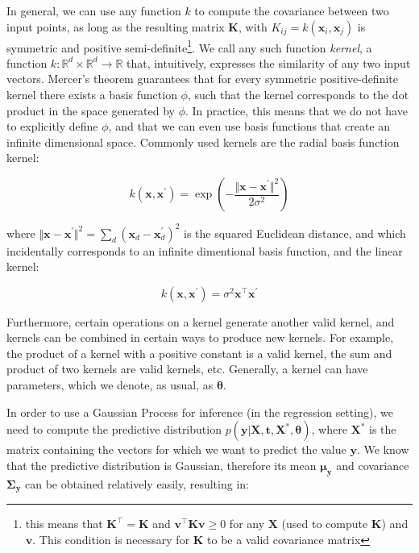 \documentclass[a4paper]{book}
\begin{document}
In general, we can use any function $k$ to compute the covariance between two input points, as long as the resulting matrix $\bm K$, with $K_{ij}=k(\bm x_i,\bm x_j)$ is symmetric and positive semi-definite\footnote{this means that $\bm K^\intercal=\bm K$ and $\bm v^\intercal\bm K\bm v\geq 0$ for any $\bm X$ (used to compute $\bm K$) and $\bm v$. This condition is necessary for $\bm K$ to be a valid covariance matrix}. We call any such function  \emph{kernel}, a function $k:\mathbb{R}^d\times\mathbb{R}^d\rightarrow\mathbb{R}$ that, intuitively, expresses the similarity of any two input vectors. Mercer's theorem guarantees that for every symmetric positive-definite kernel there exists a basis function $\phi$, such that the kernel corresponds to the dot product in the space generated by $\phi$. In practice, this means that we do not have to explicitly define $\phi$, and that we can even use basis functions that create an infinite dimensional space. Commonly used kernels are the radial basis function kernel:

\begin{equation}
k(\bm x, \bm x^\prime)=\exp\left(-\frac{\Vert\bm x-\bm x^\prime\Vert^2}{2\sigma^2}\right)
\end{equation}

\noindent where $\Vert\bm x-\bm x^\prime\Vert^2=\sum_d(\bm x_d-\bm x_d^\prime)^2$ is the squared Euclidean distance, and which incidentally corresponds to an infinite dimentional basis function, and the linear kernel:

\begin{equation}
k(\bm x, \bm x^\prime)=\sigma^2\bm x^\intercal\bm x^\prime
\end{equation}

Furthermore, certain operations on a kernel generate another valid kernel, and kernels can be combined in certain ways to produce new kernels. For example, the product of a kernel with a positive constant is a valid kernel, the sum and product of two kernels are valid kernels, etc. Generally, a kernel can have parameters, which we denote, as usual, as $\bm\theta$.

In order to use a Gaussian Process for inference (in the regression setting), we need to compute the predictive distribution $p(\bm y\vert\bm X, \bm t, \bm X^*,\bm\theta) $, where $\bm X^*$ is the matrix containing the vectors for which we want to predict the value $\bm y$. We know that the predictive distribution is Gaussian, therefore its mean $\bm\mu_{\bm y}$ and covariance $\bm\Sigma_{\bm y}$ can be obtained relatively easily, resulting in:
\end{document}

